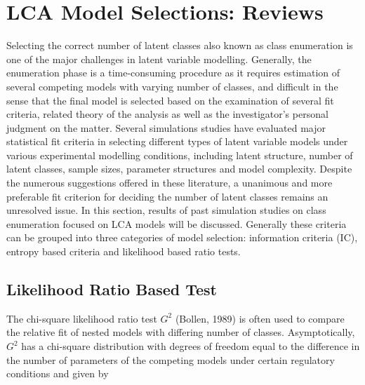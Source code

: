 \section{LCA Model Selections: Reviews}
Selecting the correct number of latent classes also known as class enumeration is one of the major challenges in latent variable modelling. Generally, the enumeration phase is a time-consuming procedure as it requires estimation of several competing models with varying number of classes, and difficult in the sense that the final model is selected based on the examination of several fit criteria, related theory of the analysis as well as the investigator’s personal judgment on the matter.  Several simulations studies have evaluated major statistical fit criteria in selecting different types of latent variable models under various experimental modelling conditions, including latent structure, number of latent classes, sample sizes, parameter structures and model complexity. Despite the numerous suggestions offered in these literature, a unanimous and more preferable fit criterion for deciding the number of latent classes remains an unresolved issue. In this section, results of past simulation studies on class enumeration focused on LCA models will be discussed. Generally these criteria can be grouped into three categories of model selection: information criteria (IC), entropy based criteria and likelihood based ratio tests.




\subsection{Likelihood Ratio Based Test}
The chi-square likelihood ratio test $G^{2}$ (Bollen, 1989) is often used to compare the relative fit of nested models with differing number of classes. Asymptotically, $G^2$ has a chi-square distribution with degrees of freedom equal to the difference in the number of parameters of the competing models under certain regulatory conditions and given by 

